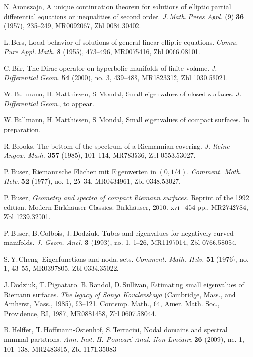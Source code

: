 \begin{thebibliography}{99}
N.\,Aronszajn,
A unique continuation theorem for solutions of elliptic partial differential equations
or inequalities of second order.
\emph{J.\,Math.\,Pures Appl.} (9) {\bf 36} (1957), 235--249,
MR0092067, Zbl 0084.30402.

L.\,Bers,
Local behavior of solutions of general linear elliptic equations.
\emph{Comm.\,Pure Appl.\,Math.} {\bf 8} (1955), 473--496,
MR0075416, Zbl 0066.08101.

C.\,B\"ar,
The Dirac operator on hyperbolic manifolds of finite volume.
\emph{J. Differential Geom.} {\bf 54} (2000), no. 3, 439--488,
MR1823312, Zbl 1030.58021.

W.\,Ballmann, H.\,Matthiesen, S.\,Mondal,
Small eigenvalues of closed surfaces.
\emph{J. Differential Geom.}, to appear.

W.\,Ballmann, H.\,Matthiesen, S.\,Mondal,
Small eigenvalues of compact surfaces.
In preparation.

R.\,Brooks,
The bottom of the spectrum of a Riemannian covering.
\emph{J. Reine Angew. Math.} {\bf 357} (1985), 101--114,
MR783536, Zbl 0553.53027.

P.\,Buser,
Riemannsche Fl\"achen mit Eigenwerten in $(0,1/4)$.
\emph{Comment. Math. Helv.} {\bf 52} (1977), no. 1, 25--34,
MR0434961, Zbl 0348.53027.

P.\,Buser,
\emph{Geometry and spectra of compact Riemann surfaces.}
Reprint of the 1992 edition. Modern Birkh\"auser Classics.
Birkh\"auser, 2010. xvi+454 pp.,
MR2742784, Zbl 1239.32001.

P.\,Buser, B.\,Colbois, J.\,Dodziuk,
Tubes and eigenvalues for negatively curved manifolds.
\emph{J. Geom. Anal.} {\bf 3} (1993), no. 1, 1--26,
MR1197014, Zbl 0766.58054.

S.\,Y.\,Cheng,
Eigenfunctions and nodal sets.
\emph{Comment. Math. Helv.} {\bf 51} (1976), no. 1, 43--55,
MR0397805, Zbl 0334.35022.

J.\,Dodziuk, T.\,Pignataro, B.\,Randol, D.\,Sullivan,
Estimating small eigenvalues of Riemann surfaces.
\emph{The legacy of Sonya Kovalevskaya}
(Cambridge, Mass., and Amherst, Mass., 1985),
93--121, Contemp. Math., 64, Amer. Math. Soc., Providence, RI, 1987,
MR0881458, Zbl 0607.58044.

B.\,Helffer, T.\,Hoffmann-Ostenhof, S.\,Terracini,
Nodal domains and spectral minimal partitions.
\emph{Ann. Inst. H. Poincar\'e Anal. Non Lin\'eaire} {\bf 26} (2009), no. 1, 101--138,
MR2483815, Zbl 1171.35083.


\end{thebibliography}
